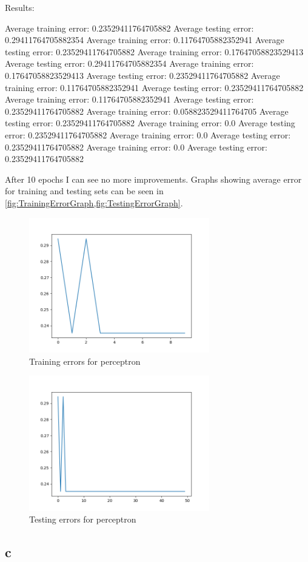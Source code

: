 \documentclass[a4,12pt]{extarticle}
\newcommand{\mysubsection}[2]{  
\setcounter{subsection}{#1}
\subsection*{#2}
\addcontentsline{toc}{subsection}{#2}
}
\begin{document}
Results:
\begin{verbatim*}
Average training error: 0.23529411764705882
Average testing error: 0.29411764705882354
Average training error: 0.11764705882352941
Average testing error: 0.23529411764705882
Average training error: 0.17647058823529413
Average testing error: 0.29411764705882354
Average training error: 0.17647058823529413
Average testing error: 0.23529411764705882
Average training error: 0.11764705882352941
Average testing error: 0.23529411764705882
Average training error: 0.11764705882352941
Average testing error: 0.23529411764705882
Average training error: 0.058823529411764705
Average testing error: 0.23529411764705882
Average training error: 0.0
Average testing error: 0.23529411764705882
Average training error: 0.0
Average testing error: 0.23529411764705882
Average training error: 0.0
Average testing error: 0.23529411764705882
\end{verbatim*}
After 10 epochs I can see no more improvements. Graphs showing average error for training and testing sets can be seen in \cref{fig:TrainingErrorGraph,fig:TestingErrorGraph}.
\begin{figure}[H]
  \centering
  \includegraphics[width=0.7\textwidth]{TrainingErrorGraph}
  \caption{Training errors for perceptron}
  \label{fig:TrainingErrorGraph}
\end{figure}
\begin{figure}[H]
  \centering
  \includegraphics[width=0.7\textwidth]{TestingErrorGraph}
  \caption{Testing errors for perceptron}
  \label{fig:TestingErrorGraph}
\end{figure}

\mysubsection{3}{c}
\end{document}
